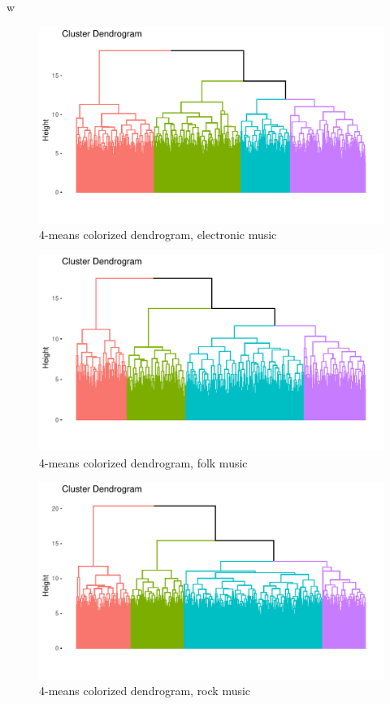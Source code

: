 w\documentclass[11pt, oneside]{article}
\begin{document}
\begin{figure}[h!]
\centering
\includegraphics[width=\textwidth]{elec_graph.pdf} 
\caption{4-means colorized dendrogram, electronic music}
\label{fig:elecdend}
\end{figure}
\begin{figure}[h!]
\centering
\includegraphics[width=\textwidth]{folk_graph.pdf} 
\caption{4-means colorized dendrogram, folk music}
\label{fig:folkdend}
\end{figure}

\begin{figure}[h!]
\centering
\includegraphics[width=\textwidth]{rock_graph.pdf} 
\caption{4-means colorized dendrogram, rock music}
\label{fig:rockdend}
\end{figure}
\end{document}

